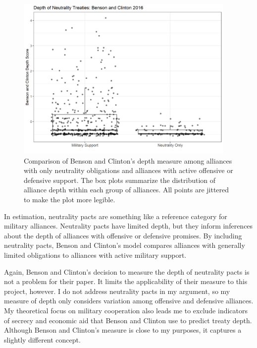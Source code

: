 \documentclass[12pt]{article}
\begin{document}
\begin{figure}[htbp]
	\centering
		\includegraphics[width=0.95\textwidth]{bc2016-neutral.png}
	\caption{Comparison of Benson and Clinton's depth measure among alliances with only neutrality obligations and alliances with active offensive or defensive support. The box plots summarize the distribution of alliance depth within each group of alliances. All points are jittered to make the plot more legible.}
	\label{fig:bc2016-neutral}
\end{figure}
In estimation, neutrality pacts are something like a reference category for military alliances. 
Neutrality pacts have limited depth, but they inform inferences about the depth of alliances with offensive or defensive promises. 
By including neutrality pacts, Benson and Clinton's model compares alliances with generally limited obligations to alliances with active military support.


Again, Benson and Clinton's decision to measure the depth of neutrality pacts is not a problem for their paper. 
It limits the applicability of their measure to this project, however. 
I do not address neutrality pacts in my argument, so my measure of depth only considers variation among offensive and defensive alliances. 
My theoretical focus on military cooperation also leads me to exclude indicators of secrecy and economic aid that Benson and Clinton use to predict treaty depth. 
Although Benson and Clinton's measure is close to my purposes, it captures a slightly different concept. 
\end{document}
